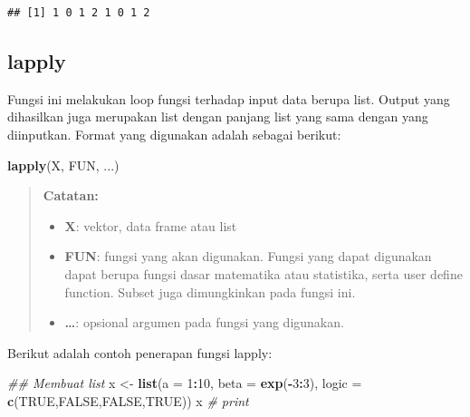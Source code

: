 \documentclass[]{book}
\newenvironment{Shaded}{\begin{snugshade}}{\end{snugshade}}
\newcommand{\CommentTok}[1]{\textcolor[rgb]{0.56,0.35,0.01}{\textit{#1}}}
\newcommand{\DataTypeTok}[1]{\textcolor[rgb]{0.13,0.29,0.53}{#1}}
\newcommand{\DecValTok}[1]{\textcolor[rgb]{0.00,0.00,0.81}{#1}}
\newcommand{\KeywordTok}[1]{\textcolor[rgb]{0.13,0.29,0.53}{\textbf{#1}}}
\newcommand{\NormalTok}[1]{#1}
\newcommand{\OperatorTok}[1]{\textcolor[rgb]{0.81,0.36,0.00}{\textbf{#1}}}
\newcommand{\OtherTok}[1]{\textcolor[rgb]{0.56,0.35,0.01}{#1}}
\newcommand{\StringTok}[1]{\textcolor[rgb]{0.31,0.60,0.02}{#1}}
\providecommand{\tightlist}{%
  \setlength{\itemsep}{0pt}\setlength{\parskip}{0pt}}
\theoremstyle{definition}
\theoremstyle{definition}
\theoremstyle{definition}
\theoremstyle{remark}
\begin{document}
\begin{verbatim}
## [1] 1 0 1 2 1 0 1 2
\end{verbatim}

\hypertarget{lapply}{%
\subsection{lapply}\label{lapply}}

Fungsi ini melakukan loop fungsi terhadap input data berupa list. Output yang dihasilkan juga merupakan list dengan panjang list yang sama dengan yang diinputkan. Format yang digunakan adalah sebagai berikut:

\begin{Shaded}
\begin{Highlighting}[]
\KeywordTok{lapply}\NormalTok{(X, FUN, ...)}
\end{Highlighting}
\end{Shaded}

\begin{quote}
\textbf{Catatan:}

\begin{itemize}
\tightlist
\item
  \textbf{X}: vektor, data frame atau list
\item
  \textbf{FUN}: fungsi yang akan digunakan. Fungsi yang dapat digunakan dapat berupa fungsi dasar matematika atau statistika, serta user define function. Subset juga dimungkinkan pada fungsi ini.
\item
  \textbf{\ldots{}}: opsional argumen pada fungsi yang digunakan.
\end{itemize}
\end{quote}

Berikut adalah contoh penerapan fungsi lapply:

\begin{Shaded}
\begin{Highlighting}[]
\CommentTok{## Membuat list}
\NormalTok{x <-}\StringTok{ }\KeywordTok{list}\NormalTok{(}\DataTypeTok{a =} \DecValTok{1}\OperatorTok{:}\DecValTok{10}\NormalTok{, }\DataTypeTok{beta =} \KeywordTok{exp}\NormalTok{(}\OperatorTok{-}\DecValTok{3}\OperatorTok{:}\DecValTok{3}\NormalTok{), }\DataTypeTok{logic =} \KeywordTok{c}\NormalTok{(}\OtherTok{TRUE}\NormalTok{,}\OtherTok{FALSE}\NormalTok{,}\OtherTok{FALSE}\NormalTok{,}\OtherTok{TRUE}\NormalTok{))}
\NormalTok{x }\CommentTok{# print}
\end{Highlighting}
\end{Shaded}
\end{document}
